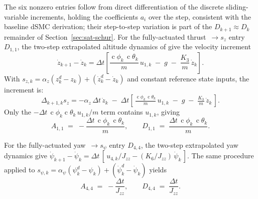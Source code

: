 \documentclass[conf]{new-aiaa}
\DeclareMathOperator{\cs}{c}
\begin{document}
The six nonzero entries follow from direct differentiation of the discrete sliding-variable increments, holding the coefficients $a_i$ over the step, consistent with the baseline dSMC derivation; their step-to-step variation is part of the $D_{k+1} \approx D_k$ remainder of Section~\ref{sec:sat-schur}. For the fully-actuated thrust~$\to s_z$ entry $D_{1,1}$, the two-step extrapolated altitude dynamics of \cite{refs:Xiong2016} give the velocity increment
\small
\begin{equation}
\label{eq:sat-ddz-evolution}
\dot z_{k+1} - \dot z_k = \Delta t \left[ \frac{\cs\phi_k\, \cs\theta_k}{m}\, u_{1,k} \;-\; g \;-\; \frac{K_3}{m}\,\dot z_k \right].
\end{equation}
\normalsize
With $s_{z,k} = \alpha_z(z_k^d - z_k) + (\dot z_k^d - \dot z_k)$ and constant reference state inputs, the increment is:
\small
\begin{equation}
\Delta_{k+1,k} s_z
= -\alpha_z\, \Delta t\, \dot z_k \;-\; \Delta t\!\left[\, \tfrac{\cs\phi_k\, \cs\theta_k}{m}\, u_{1,k} \;-\; g \;-\; \tfrac{K_3}{m}\,\dot z_k \,\right].
\end{equation}
\normalsize
Only the $-\Delta t\, \cs\phi_k \cs\theta_k\, u_{1,k}/m$ term contains $u_{1,k}$, giving
\begin{equation}
\label{eq:sat-A-thrust}
A_{1,1} \;=\; -\frac{\Delta t\,\cs\phi_k\, \cs\theta_k}{m},
\qquad
D_{1,1} \;=\; \frac{\Delta t\,\cs\phi_k\, \cs\theta_k}{m}.
\end{equation}

For the fully-actuated yaw~$\to s_\psi$ entry $D_{4,4}$, the two-step extrapolated yaw dynamics give $\dot\psi_{k+1} - \dot\psi_k = \Delta t\,[\, u_{4,k}/J_{zz} - (K_6/J_{zz})\,\dot\psi_k\,]$. The same procedure applied to $s_{\psi,k} = \alpha_\psi(\psi_k^d - \psi_k) + (\dot\psi_k^d - \dot\psi_k)$ yields
\begin{equation}
A_{4,4} \;=\; -\frac{\Delta t}{J_{zz}},
\qquad
D_{4,4} \;=\; \frac{\Delta t}{J_{zz}}.
\end{equation}
\end{document}
